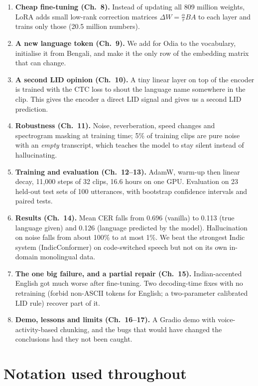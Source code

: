 \begin{enumerate}[leftmargin=*]
and test data, and \emph{rebalance} the mix so that every language gets exactly 90 hours per epoch (plus 70 hours of code-switched
speech).
\item \textbf{Cheap fine-tuning (Ch.~8).} Instead of updating all 809 million weights, LoRA adds small low-rank correction matrices
$\Delta W = \tfrac{\alpha}{r}BA$ to each layer and trains only those (20.5 million numbers).
\item \textbf{A new language token (Ch.~9).} We add  for Odia to the vocabulary, initialise it from Bengali, and make it
the only row of the embedding matrix that can change.
\item \textbf{A second LID opinion (Ch.~10).} A tiny linear layer on top of the encoder is trained with the CTC loss to shout the
language name somewhere in the clip. This gives the encoder a direct LID signal and gives us a second LID prediction.
\item \textbf{Robustness (Ch.~11).} Noise, reverberation, speed changes and spectrogram masking at training time; 5\% of training
clips are pure noise with an \emph{empty} transcript, which teaches the model to stay silent instead of hallucinating.
\item \textbf{Training and evaluation (Ch.~12--13).} AdamW, warm-up then linear decay, 11{,}000 steps of 32 clips, 16.6 hours on
one GPU. Evaluation on 23 held-out test sets of 100 utterances, with bootstrap confidence intervals and paired tests.
\item \textbf{Results (Ch.~14).} Mean CER falls from 0.696 (vanilla) to 0.113 (true language given) and 0.126 (language predicted
by the model). Hallucination on noise falls from about 100\% to at most 1\%. We beat the strongest Indic system (IndicConformer)
on code-switched speech but not on its own in-domain monolingual data.
\item \textbf{The one big failure, and a partial repair (Ch.~15).} Indian-accented English got much worse after fine-tuning. Two
decoding-time fixes with no retraining (forbid non-ASCII tokens for English; a two-parameter calibrated LID rule) recover part of it.
\item \textbf{Demo, lessons and limits (Ch.~16--17).} A Gradio demo with voice-activity-based chunking, and the bugs that would
have changed the conclusions had they not been caught.
\end{enumerate}

\section*{Notation used throughout}

